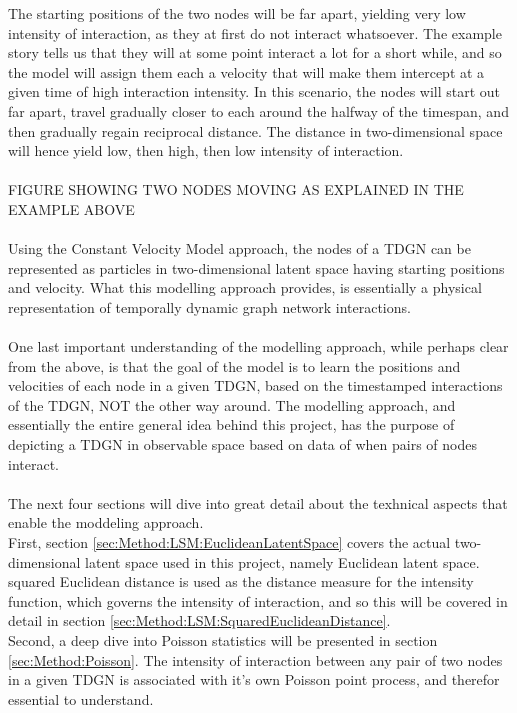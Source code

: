 The starting positions of the two nodes will be far apart, yielding very low intensity of interaction, as they at first do not interact whatsoever.
The example story tells us that they will at some point interact a lot for a short while, and so the model will assign them each a velocity that will make them intercept at a given time of high interaction intensity. 
In this scenario, the nodes will start out far apart, travel gradually closer to each around the halfway of the timespan, and then gradually regain reciprocal distance.
The distance in two-dimensional space will hence yield low, then high, then low intensity of interaction.
\\\\
FIGURE SHOWING TWO NODES MOVING AS EXPLAINED IN THE EXAMPLE ABOVE
\\\\
Using the Constant Velocity Model approach, the nodes of a TDGN can be represented as particles in two-dimensional latent space having starting positions and velocity. 
What this modelling approach provides, is essentially a physical representation of temporally dynamic graph network interactions.
\\\\
One last important understanding of the modelling approach, while perhaps clear from the above, is that the goal of the model is to learn the positions and velocities of each node in a given TDGN, based on the timestamped interactions of the TDGN, NOT the other way around. 
The modelling approach, and essentially the entire general idea behind this project, has the purpose of depicting a TDGN in observable space based on data of when pairs of nodes interact.
\\\\
The next four sections will dive into great detail about the texhnical aspects that enable the moddeling approach.
\\
First, section \ref{sec:Method:LSM:EuclideanLatentSpace} covers the actual two-dimensional latent space used in this project, namely Euclidean latent space. 
squared Euclidean distance is used as the distance measure for the intensity function, which governs the intensity of interaction, and so this will be covered in detail in section \ref{sec:Method:LSM:SquaredEuclideanDistance}.
\\
Second, a deep dive into Poisson statistics will be presented in section \ref{sec:Method:Poisson}.
The intensity of interaction between any pair of two nodes in a given TDGN is associated with it's own Poisson point process, and therefor essential to understand.
